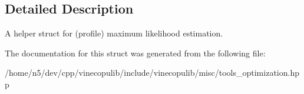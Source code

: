 \subsection{Detailed Description}
A helper struct for (profile) maximum likelihood estimation. 

The documentation for this struct was generated from the following file\+:\begin{DoxyCompactItemize}
\item 
/home/n5/dev/cpp/vinecopulib/include/vinecopulib/misc/tools\+\_\+optimization.\+hpp\end{DoxyCompactItemize}

